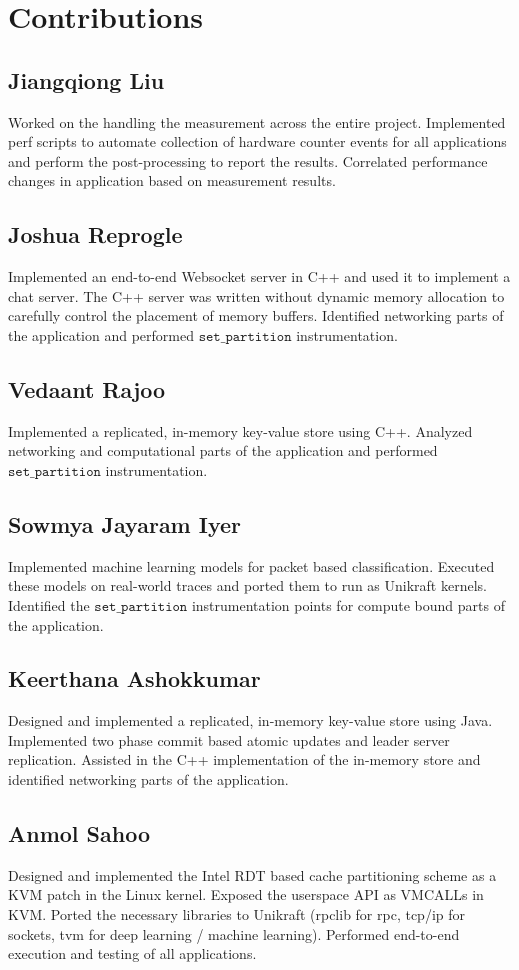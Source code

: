 \documentclass[sigconf,authorversion,noacm]{acmart}
\begin{document}
\section{Contributions}

\subsection{Jiangqiong Liu}
Worked on the handling the measurement across the entire project. Implemented
perf scripts to automate collection of hardware counter events for all
applications and perform the post-processing to report the results. Correlated
performance changes in application based on measurement results.

\subsection{Joshua Reprogle}
Implemented an end-to-end Websocket server in C++ and used it to implement a
chat server. The C++ server was written without dynamic memory allocation to
carefully control the placement of memory buffers. Identified networking parts
of the application and performed $\texttt{set\_partition}$ instrumentation.

\subsection{Vedaant Rajoo}
Implemented a replicated, in-memory key-value store using C++. Analyzed
networking and computational parts of the application and performed
$\texttt{set\_partition}$ instrumentation.

\subsection{Sowmya Jayaram Iyer}
Implemented machine learning models for packet based classification. Executed
these models on real-world traces and ported them to run as Unikraft kernels.
Identified the $\texttt{set\_partition}$ instrumentation points for compute
bound parts of the application.

\subsection{Keerthana Ashokkumar}
Designed and implemented a replicated, in-memory key-value store using Java.
Implemented two phase commit based atomic updates and leader server replication.
Assisted in the C++ implementation of the in-memory store and identified
networking parts of the application.

\subsection{Anmol Sahoo}
Designed and implemented the Intel RDT based cache partitioning scheme as a KVM
patch in the Linux kernel. Exposed the userspace API as VMCALLs in KVM. Ported
the necessary libraries to Unikraft (rpclib for rpc, tcp/ip for sockets, tvm for
deep learning / machine learning). Performed end-to-end execution and testing of
all applications.
\end{document}
